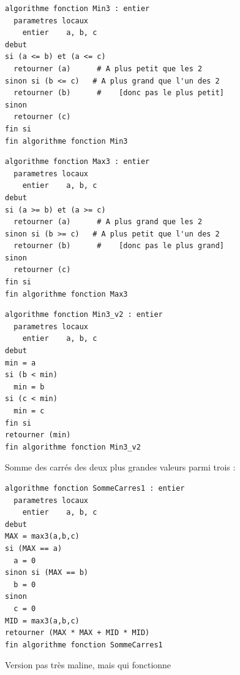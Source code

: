 \documentclass[11pt,a4paper]{article}
\begin{document}

\begin{table}[ht!]
  \centering
\begin{lstlisting}[style=algorithmique]
algorithme fonction Min3 : entier
  parametres locaux
    entier    a, b, c
debut
si (a <= b) et (a <= c)
  retourner (a)      # A plus petit que les 2
sinon si (b <= c)   # A plus grand que l'un des 2
  retourner (b)      #    [donc pas le plus petit]
sinon
  retourner (c)
fin si
fin algorithme fonction Min3 \end{lstlisting}


\begin{lstlisting}[style=algorithmique]
algorithme fonction Max3 : entier
  parametres locaux
    entier    a, b, c
debut
si (a >= b) et (a >= c)
  retourner (a)      # A plus grand que les 2
sinon si (b >= c)   # A plus petit que l'un des 2
  retourner (b)      #    [donc pas le plus grand]
sinon
  retourner (c)
fin si
fin algorithme fonction Max3 \end{lstlisting}


\begin{lstlisting}[style=algorithmique]
algorithme fonction Min3_v2 : entier
  parametres locaux
    entier    a, b, c
debut
min = a
si (b < min)
  min = b
si (c < min)
  min = c
fin si
retourner (min)
fin algorithme fonction Min3_v2 \end{lstlisting}

\end{table}

\clearpage

Somme des carrés des deux plus grandes valeurs parmi trois :

\begin{table}[ht!]
  \centering
\begin{lstlisting}[style=algorithmique]
algorithme fonction SommeCarres1 : entier
  parametres locaux
    entier    a, b, c
debut
MAX = max3(a,b,c)
si (MAX == a)
  a = 0
sinon si (MAX == b)
  b = 0
sinon
  c = 0
MID = max3(a,b,c)
retourner (MAX * MAX + MID * MID)
fin algorithme fonction SommeCarres1 \end{lstlisting}
  \caption{Version pas très maline, mais qui fonctionne}
\end{table}

\bigskip
\end{document}
